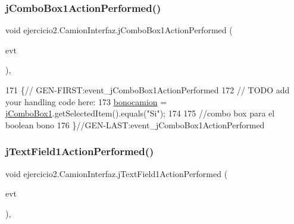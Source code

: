 \mbox{\label{classejercicio2_1_1_camion_interfaz_a636cf97354884d87701e174ee0d7f483}} 
\subsubsection{\texorpdfstring{j\+Combo\+Box1\+Action\+Performed()}{jComboBox1ActionPerformed()}}
{\footnotesize\ttfamily void ejercicio2.\+Camion\+Interfaz.\+j\+Combo\+Box1\+Action\+Performed (\begin{DoxyParamCaption}\item[{java.\+awt.\+event.\+Action\+Event}]{evt }\end{DoxyParamCaption})\hspace{0.3cm}{\ttfamily [inline]}, {\ttfamily [private]}}


\begin{DoxyCode}
171                                                                            \{\textcolor{comment}{//
      GEN-FIRST:event\_jComboBox1ActionPerformed}
172         \textcolor{comment}{// TODO add your handling code here:}
173         \mbox{\hyperlink{classejercicio2_1_1_camion_interfaz_a77b05c1adddfc9df05f67aae05d794bf}{bonocamion}} = \mbox{\hyperlink{classejercicio2_1_1_camion_interfaz_ad99726150fad438267d353b48c6aaf7d}{jComboBox1}}.getSelectedItem().equals(\textcolor{stringliteral}{"Si"});
174         
175         \textcolor{comment}{//combo box para el boolean bono}
176     \}\textcolor{comment}{//GEN-LAST:event\_jComboBox1ActionPerformed}
\end{DoxyCode}
\mbox{\label{classejercicio2_1_1_camion_interfaz_ac8b7b51b871c783eda39bb194ae0b72a}} 
\subsubsection{\texorpdfstring{j\+Text\+Field1\+Action\+Performed()}{jTextField1ActionPerformed()}}
{\footnotesize\ttfamily void ejercicio2.\+Camion\+Interfaz.\+j\+Text\+Field1\+Action\+Performed (\begin{DoxyParamCaption}\item[{java.\+awt.\+event.\+Action\+Event}]{evt }\end{DoxyParamCaption})\hspace{0.3cm}{\ttfamily [inline]}, {\ttfamily [private]}}


